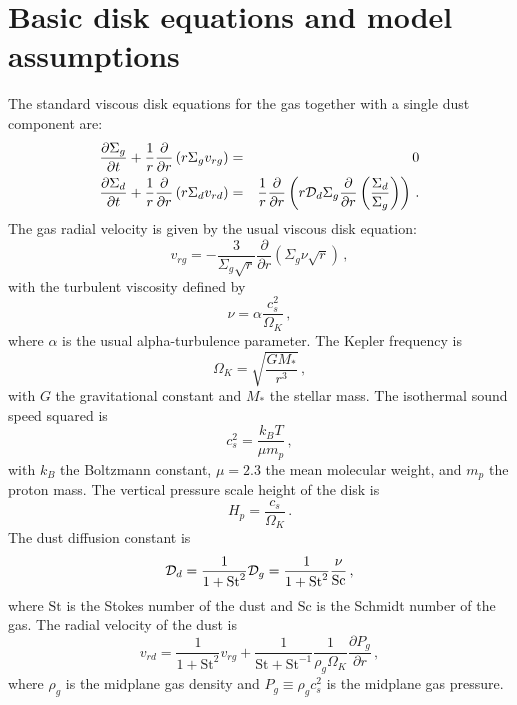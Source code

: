 \documentclass{aa}
\def\comma{\,,}
\def\fullstop{\,.}
\begin{document}
\section{Basic disk equations and model assumptions}
\label{sec-basic-equations}
%
The standard viscous disk equations for the gas together with a single dust
component are:
\begin{eqnarray}
\frac{\partial \Sigma_{g}}{\partial t} +
  \frac{1}{r}\frac{\partial}{\partial r}
  \left(r\Sigma_g v_{rg}\right) &=& 0\label{eq-gas-continuity}\\
\frac{\partial \Sigma_{d}}{\partial t} +
  \frac{1}{r}\frac{\partial}{\partial r}
  \left(r\Sigma_d v_{rd}\right) &=&
  \frac{1}{r}\frac{\partial}{\partial r}
  \left(r{\cal D}_d\Sigma_g\frac{\partial}{\partial r}
  \left(\frac{\Sigma_d}{\Sigma_g}\right)\right)\fullstop\label{eq-dust-continuity}
\end{eqnarray}
The gas radial velocity is given by the usual viscous disk equation:
\begin{equation}\label{eq-vr-gas}
  v_{rg} = - \frac{3}{\Sigma_g\sqrt{r}}\frac{\partial}{\partial r}
  \left(\Sigma_g\nu\sqrt{r}\right)\comma
\end{equation}
with the turbulent viscosity defined by
\begin{equation}\label{eq-def-nu}
\nu = \alpha \frac{c_s^2}{\Omega_K}\comma
\end{equation}
where $\alpha$ is the usual alpha-turbulence parameter. The Kepler frequency is
\begin{equation}\label{eq-omega-kepler}
\Omega_K=\sqrt{\frac{GM_{*}}{r^3}}\comma
\end{equation}
with $G$ the gravitational constant and $M_*$ the stellar mass.  The isothermal
sound speed squared is
\begin{equation}\label{eq-cs2-in-temp}
c_s^2 = \frac{k_BT}{\mu m_p}\comma
\end{equation}
with $k_B$ the Boltzmann constant, $\mu=2.3$ the mean molecular weight,
and $m_p$ the proton mass. The vertical pressure scale height of the disk is
\begin{equation}\label{eq-disk-hp}
H_p = \frac{c_s}{\Omega_K}\fullstop
\end{equation}
The dust diffusion constant is
\begin{equation}\label{eq-cald-in-nu}
  {\cal D}_d = \frac{1}{1+\mathrm{St}^2}{\cal D}_g =
  \frac{1}{1+\mathrm{St}^2}\frac{\nu}{\mathrm{Sc}}\comma
\end{equation}
where $\mathrm{St}$ is the Stokes number of the dust and $\mathrm{Sc}$ is the
Schmidt number of the gas. The radial velocity of the dust is
\begin{equation}\label{eq-vdust-1}
  v_{rd} = \frac{1}{1+\mathrm{St}^2} v_{rg}
  + \frac{1}{\mathrm{St}+\mathrm{St}^{-1}}\frac{1}{\rho_g\Omega_K}
  \frac{\partial P_g}{\partial r}\comma
\end{equation}
where $\rho_g$ is the midplane gas density and $P_g\equiv \rho_g c_s^2$ is the
midplane gas pressure.
\end{document}
